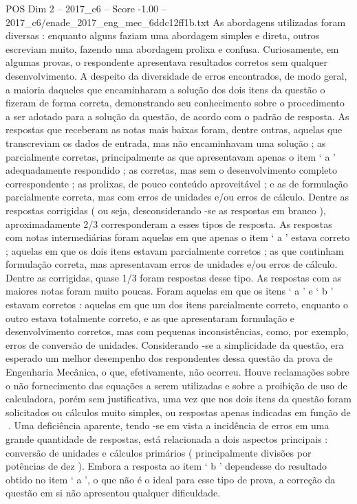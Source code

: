 \begin{textsample}{POS Dim 2 – 2017\_c6 – Score -1.00 – 2017\_c6/enade\_2017\_eng\_mec\_6ddc12ff1b.txt}
As abordagens utilizadas foram diversas : enquanto alguns faziam uma abordagem simples e direta, outros escreviam muito, fazendo uma abordagem prolixa e confusa.
Curiosamente, em algumas provas, o respondente apresentava resultados corretos sem qualquer desenvolvimento.
A despeito da diversidade de erros encontrados, de modo geral, a maioria daqueles que encaminharam a solução dos dois itens da questão o fizeram de forma correta, demonstrando seu conhecimento sobre o procedimento a ser adotado para a solução da questão, de acordo com o padrão de resposta.
As respostas que receberam as notas mais baixas foram, dentre outras, aquelas que transcreviam os dados de entrada, mas não encaminhavam uma solução ; as parcialmente corretas, principalmente as que apresentavam apenas o item ‘ a ’ adequadamente respondido ; as corretas, mas sem o desenvolvimento completo correspondente ; as prolixas, de pouco conteúdo aproveitável ; e as de formulação parcialmente correta, mas com erros de unidades e/ou erros de cálculo.
Dentre as respostas corrigidas ( ou seja, desconsiderando -se as respostas em branco ), aproximadamente 2/3 corresponderam a esses tipos de resposta.
As respostas com notas intermediárias foram aquelas em que apenas o item ‘ a ’ estava correto ; aquelas em que os dois itens estavam parcialmente corretos ; as que continham formulação correta, mas apresentavam erros de unidades e/ou erros de cálculo.
Dentre as corrigidas, quase 1/3 foram respostas desse tipo.
As respostas com as maiores notas foram muito poucas.
Foram aquelas em que os itens ‘ a ’ e ‘ b ’ estavam corretos : aquelas em que um dos itens parcialmente correto, enquanto o outro estava totalmente correto, e as que apresentaram formulação e desenvolvimento corretos, mas com pequenas inconsistências, como, por exemplo, erros de conversão de unidades.
Considerando -se a simplicidade da questão, era esperado um melhor desempenho dos respondentes dessa questão da prova de Engenharia Mecânica, o que, efetivamente, não ocorreu.
Houve reclamações sobre o não fornecimento das equações a serem utilizadas e sobre a proibição de uso de calculadora, porém sem justificativa, uma vez que nos dois itens da questão foram solicitados ou cálculos muito simples, ou respostas apenas indicadas em função de .
Uma deficiência aparente, tendo -se em vista a incidência de erros em uma grande quantidade de respostas, está relacionada a dois aspectos principais : conversão de unidades e cálculos primários ( principalmente divisões por potências de dez ).
Embora a resposta ao item ‘ b ’ dependesse do resultado obtido no item ‘ a ’, o que não é o ideal para esse tipo de prova, a correção da questão em si não apresentou qualquer dificuldade.

\end{textsample}
